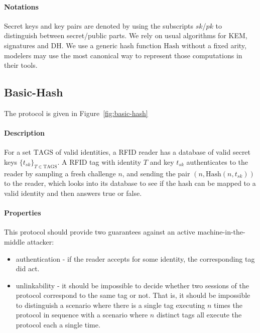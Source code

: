 \documentclass{article}
\newcommand{\sfsk}{\mathit{sk}}
\newcommand{\sfpk}{\mathit{pk}}
\newcommand{\kwf}[1]{\mathrm{#1}}
\newcommand{\hash}{\kwf{Hash}}
\newcommand{\tagset}{\kwf{TAGS}}
\begin{document}
\paragraph{Notations} Secret keys and key pairs are denoted by using the subscripts $\sfsk$/$\sfpk$ to distinguish between secret/public parts. We rely on usual algorithms for KEM, signatures and DH. We use a generic hash function $\hash$ without a fixed arity, modelers may use the most canonical way to represent those computations in their tools.

\subsection{Basic-Hash}

The protocol is given in Figure~\ref{fig:basic-hash}

\paragraph{Description} For a set $\tagset$ of valid identities, a RFID reader has a database of valid secret keys $\{t_\sfsk\}_{T \in \tagset}$. A RFID tag with identity $T$ and key $t_\sfsk$ authenticates to the reader by sampling a fresh challenge $n$, and sending the pair $(n,\hash(n,t_\sfsk))$ to the reader, which looks into its database to see if the hash can be mapped to a valid identity and then answers true or false.


\paragraph{Properties} This protocol should provide two guarantees against an active machine-in-the-middle attacker:
\begin{itemize}
\item authentication - if the reader accepts for some identity, the corresponding tag did act.
\item unlinkability - it should be impossible to decide whether two sessions of the protocol correspond to the same tag or not. That is, it should be impossible to distinguish a scenario where there is a single tag executing $n$ times the protocol in sequence with a scenario where $n$ distinct tags all execute the protocol each a single time. 
\end{itemize}
\end{document}
